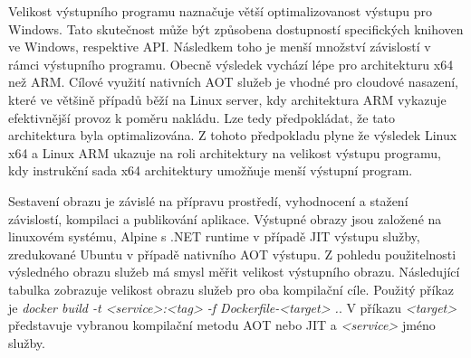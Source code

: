 
Velikost výstupního programu naznačuje větší optimalizovanost výstupu pro Windows. Tato skutečnost může být způsobena dostupností specifických knihoven ve Windows, respektive API. Následkem toho je menší množství závislostí v rámci výstupního programu. Obecně výsledek vychází lépe pro architekturu x64 než ARM. Cílové využití nativních AOT služeb je vhodné pro cloudové nasazení, které ve většině případů běží na Linux server, kdy architektura ARM vykazuje efektivnější provoz k poměru nakládu. Lze tedy předpokládat, že tato architektura byla optimalizována. Z tohoto předpokladu plyne že výsledek Linux x64 a Linux ARM ukazuje na roli architektury na velikost výstupu programu, kdy instrukční sada x64 architektury umožňuje menší výstupní program.

Sestavení obrazu je závislé na přípravu prostředí, vyhodnocení a stažení závislostí, kompilaci a publikování aplikace. Výstupné obrazy jsou založené na linuxovém systému, Alpine s .NET runtime v případě JIT výstupu služby, zredukované Ubuntu v případě nativního AOT výstupu. Z pohledu použitelnosti výsledného obrazu služeb má smysl měřit velikost výstupního obrazu. Následující tabulka zobrazuje velikost obrazu služeb pro oba kompilační cíle. Použitý příkaz je \emph{docker build -t <service>:<tag> -f Dockerfile-<target> .}. V příkazu \emph{<target>} představuje vybranou kompilační metodu AOT nebo JIT a \emph{<service>} jméno služby.


